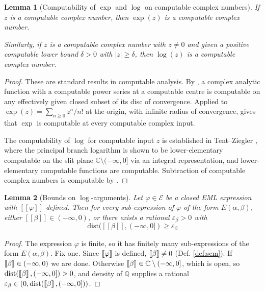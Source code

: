 \documentclass[a4paper,10pt]{article}
\newtheorem{lemma}{Lemma}
\newcommand{\rrbracket}{\right]\hspace{-0.15em}\right]}
\newcommand{\llbracket}{\left[\hspace{-0.15em}\left[}
\newcommand{\interpret}[1]{\llbracket #1 \rrbracket}
\begin{document}
\begin{lemma}[Computability of $\exp$ and $\log$ on computable complex numbers]\label{lemma:comp-exp-log}
    If $z$ is a computable complex number, then $\exp(z)$ is a computable complex number. 

    Similarly, if $z$ is a computable complex number with $z\neq 0$ and given a positive computable lower bound $\delta > 0$ with $|z|\geq \delta$, then $\log(z)$ is a computable complex number.
\end{lemma}

\begin{proof} 
These are standard results in computable analysis. By \cite[Thm.~6.5.2]{Weihrauch2000}, a complex analytic function with a computable power series at a computable centre is computable on any effectively given closed subset of its disc of convergence. Applied to $\exp(z) = \sum_{n \geq 0} z^n / n!$ at the origin, with infinite radius of convergence, \cite[Thm.~6.5.2]{Weihrauch2000} gives that $\exp$ is computable at every computable complex input.

The computability of $\log$ for computable input $z$ is established in Tent–Ziegler \cite[\S3–4]{TZ2009}, where the principal branch logarithm is shown to be lower-elementary computable on the slit plane $\mathbb{C} \setminus (-\infty, 0]$ via an integral representation, and lower-elementary computable functions are computable. Subtraction of computable complex numbers is computable by \cite[Thm. 4.3.9]{Weihrauch2000}.
\end{proof}

\begin{lemma}[Bounds on $\log$-arguments]
\label{lemma:log-bounds}
    Let $\varphi \in \mathcal{E}$ be a closed EML expression with $[\![\varphi]\!]$ defined. Then for every sub-expression of $\varphi$ of the form $E(\alpha, \beta)$, either $[\![\beta]\!] \in (-\infty, 0)$, or there exists a rational $\varepsilon_\beta > 0$ with $$\mathrm{dist}([\![\beta]\!], (-\infty, 0]) \geq \varepsilon_\beta$$
\end{lemma}
\begin{proof}
    The expression $\varphi$ is finite, so it has finitely many sub-expressions of the form $E(\alpha, \beta)$. Fix one. Since $\interpret{\varphi}$ is defined, $\interpret{\beta} \neq 0$ (Def. \ref{def:sem}). If $\interpret{\beta} \in (-\infty, 0)$ we are done. Otherwise $\interpret{\beta} \in \mathbb{C} \setminus (-\infty, 0]$, which is open, so $\mathrm{dist}(\interpret{\beta}, (-\infty, 0]) > 0$, and density of $\mathbb{Q}$ supplies a rational $\varepsilon_\beta \in (0, \mathrm{dist}(\interpret{\beta}, (-\infty, 0]))$.
\end{proof}
\end{document}
